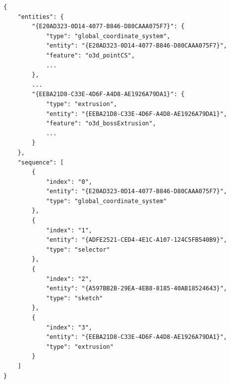 

\begin{verbatim}
{
    "entities": {
        "{E20AD323-0D14-4077-B846-D80CAAA075F7}": {
            "type": "global_coordinate_system",
            "entity": "{E20AD323-0D14-4077-B846-D80CAAA075F7}",
            "feature": "o3d_pointCS",
            ...
        },
        ...
        "{EEBA21D8-C33E-4D6F-A4D8-AE1926A79DA1}": {
            "type": "extrusion",
            "entity": "{EEBA21D8-C33E-4D6F-A4D8-AE1926A79DA1}",
            "feature": "o3d_bossExtrusion",
            ...
        }
    },
    "sequence": [
        {
            "index": "0",
            "entity": "{E20AD323-0D14-4077-B846-D80CAAA075F7}",
            "type": "global_coordinate_system"
        },
        {
            "index": "1",
            "entity": "{ADFE2521-CED4-4E1C-A107-124C5FB540B9}",
            "type": "selector"
        },
        {
            "index": "2",
            "entity": "{A597BB2B-29EA-4EB8-8185-40AB18524643}",
            "type": "sketch"
        },
        {
            "index": "3",
            "entity": "{EEBA21D8-C33E-4D6F-A4D8-AE1926A79DA1}",
            "type": "extrusion"
        }
    ]
}
\end{verbatim}

